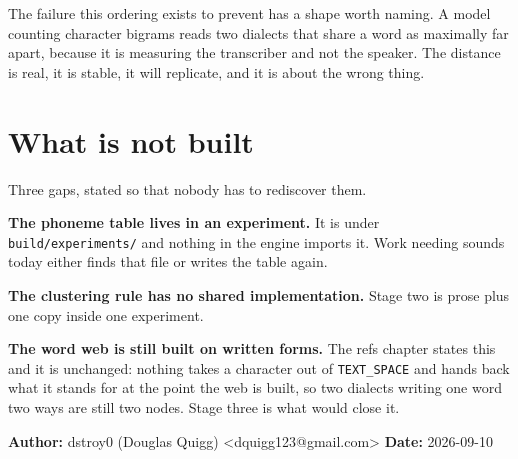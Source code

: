 The failure this ordering exists to prevent has a shape worth naming. A model counting character
bigrams reads two dialects that share a word as maximally far apart, because it is measuring the
transcriber and not the speaker. The distance is real, it is stable, it will replicate, and it is
about the wrong thing.

\section{What is not built}

Three gaps, stated so that nobody has to rediscover them.

\textbf{The phoneme table lives in an experiment.} It is under
\texttt{build/\allowbreak{}experiments/\allowbreak{}} and nothing in the engine imports it. Work
needing sounds today either finds that file or writes the table again.

\textbf{The clustering rule has no shared implementation.} Stage two is prose plus one copy inside
one experiment.

\textbf{The word web is still built on written forms.} The refs chapter states this and it is
unchanged: nothing takes a character out of \texttt{TEXT\_\allowbreak{}SPACE} and hands back what it
stands for at the point the web is built, so two dialects writing one word two ways are still two
nodes. Stage three is what would close it.

\textbf{Author:} dstroy0 (Douglas Quigg) <dquigg123@gmail.com>
\textbf{Date:} 2026-09-10
